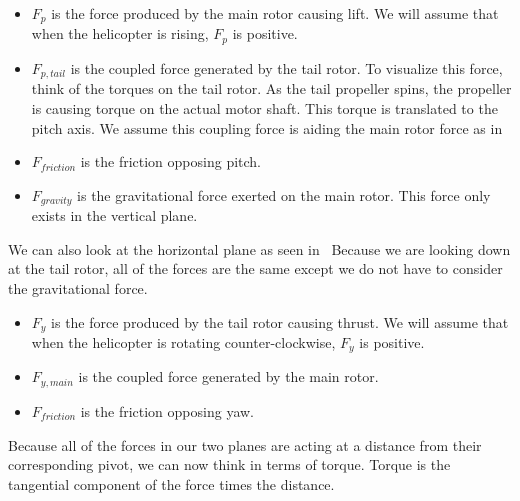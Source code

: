 \documentclass[fontsize=11pt, %
                             paper=letter, %
                             twoside, %
                             captions=tableheading,
                             index=totoc,
                             hyperref]{labbook}
\begin{document}
\begin{addmargin}[0cm]{0cm}
\begin{itemize}
    \item $F_p$ is the force produced by the main rotor causing lift. We will assume that when the helicopter is rising, $F_p$ is positive.
    \item $F_{p,tail}$ is the coupled force generated by the tail rotor. To visualize this force, think of the torques on the tail rotor. As the tail propeller spins, the propeller is causing torque on the actual motor shaft. This torque is translated to the pitch axis. We assume this coupling force is aiding the main rotor force as in %
    \item $F_{friction}$ is the friction opposing pitch.
    \item $F_{gravity}$ is the gravitational force exerted on the main rotor. This force only exists in the vertical plane.
\end{itemize}


We can also look at the horizontal plane as seen in~%
Because we are looking down at the tail rotor, all of the forces are the same except we do not have to consider the gravitational force.

\begin{itemize}
    \item $F_y$ is the force produced by the tail rotor causing thrust. We will assume that when the helicopter is rotating counter-clockwise, $F_y$ is positive.
    \item $F_{y,main}$ is the coupled force generated by the main rotor. %
    \item $F_{friction}$ is the friction opposing yaw.
\end{itemize}

Because all of the forces in our two planes are acting at a distance from their corresponding pivot, we can now think in terms of torque. Torque is the tangential component of the force times the distance. %


 
 
\end{addmargin}
\end{document}
